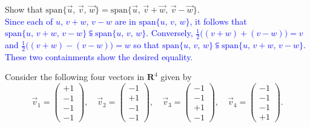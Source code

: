 \documentclass[a4paper,11pt]{article}
\newcommand{\R}{\mathbf{R}}
\newcommand{\BB}[1]{\textcolor{blue}{#1}}
\begin{document}
 Show that
$\text{span}\{\vec u,\,\vec v,\,\vec w\}=\text{span}\{\vec u,\,\vec v+\vec
w,\,\vec v-\vec w\}$. \\

\BB{Since each of $u,\,v+w,\,v-w$ are in $\text{span}\{u,\,v,\,w\}$, it follows
  that $\text{span}\{u,\,v+w,\,v-w\} \subseteqq \text{span}\{u,\,v,\,w\}$.
  Conversely, $\frac{1}{2}\Big( (v+w)+(v-w) \Big)=v$ and $\frac{1}{2}\Big(
  (v+w)-(v-w) \Big)=w$ so that $\text{span}\{u,\,v,\,w\} \subseteqq
  \text{span}\{u,\,v+w,\,v-w\}$. These two containments show the desired
  equality. \\}

 Consider the following four vectors in $\R^4$
given by
\[
  \vec v_1 = \begin{pmatrix}+1 \\ -1 \\ -1 \\ -1\end{pmatrix},  \quad
  \vec v_2 = \begin{pmatrix}-1 \\ +1 \\ -1 \\ -1\end{pmatrix}, \quad
  \vec v_3 = \begin{pmatrix}-1 \\ -1 \\ +1 \\ -1\end{pmatrix}, \quad
  \vec v_4 = \begin{pmatrix}-1 \\ -1 \\ -1 \\ +1\end{pmatrix}.
\]
\end{document}
